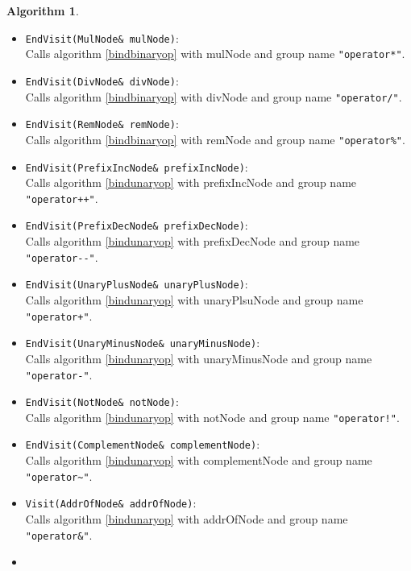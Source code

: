 \documentclass[a4paper,oneside,11pt]{book}
\theoremstyle{definition}
\newtheorem{algo}{Algorithm}[section]
\begin{document}
\begin{algo}
\begin{itemize}
\item
\verb|EndVisit(MulNode& mulNode)|:\\
Calls algorithm \ref{bindbinaryop} with mulNode and group name \verb|"operator*"|.\\
\item
\verb|EndVisit(DivNode& divNode)|:\\
Calls algorithm \ref{bindbinaryop} with divNode and group name \verb|"operator/"|.\\
\item
\verb|EndVisit(RemNode& remNode)|:\\
Calls algorithm \ref{bindbinaryop} with remNode and group name \verb|"operator%"|.\\
\item
\verb|EndVisit(PrefixIncNode& prefixIncNode)|:\\
Calls algorithm \ref{bindunaryop} with prefixIncNode and group name \verb|"operator++"|.\\
\item
\verb|EndVisit(PrefixDecNode& prefixDecNode)|:\\
Calls algorithm \ref{bindunaryop} with prefixDecNode and group name \verb|"operator--"|.\\
\item
\verb|EndVisit(UnaryPlusNode& unaryPlusNode)|:\\
Calls algorithm \ref{bindunaryop} with unaryPlsuNode and group name \verb|"operator+"|.\\
\item
\verb|EndVisit(UnaryMinusNode& unaryMinusNode)|:\\
Calls algorithm \ref{bindunaryop} with unaryMinusNode and group name \verb|"operator-"|.\\
\item
\verb|EndVisit(NotNode& notNode)|:\\
Calls algorithm \ref{bindunaryop} with notNode and group name \verb|"operator!"|.\\
\item
\verb|EndVisit(ComplementNode& complementNode)|:\\
Calls algorithm \ref{bindunaryop} with complementNode and group name \verb|"operator~"|.\\
\item
\verb|Visit(AddrOfNode& addrOfNode)|:\\
Calls algorithm \ref{bindunaryop} with addrOfNode and group name \verb|"operator&"|.\\
\item

\end{itemize}
\end{algo}
\end{document}
